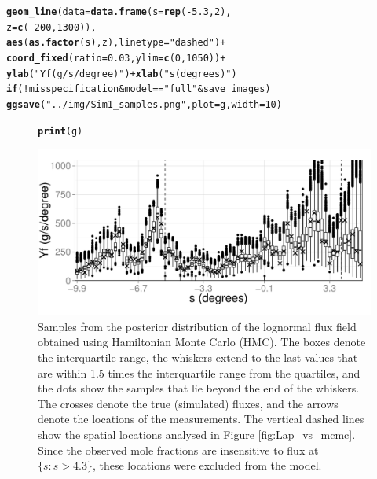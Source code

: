 \documentclass[a4paper,11pt]{article}\usepackage[]{graphicx}\usepackage[]{color}
\makeatletter
\def\maxwidth{ %
  \ifdim\Gin@nat@width>\linewidth
    \linewidth
  \else
    \Gin@nat@width
  \fi
}
\newcommand{\hlnum}[1]{\textcolor[rgb]{0.686,0.059,0.569}{#1}}%
\newcommand{\hlstr}[1]{\textcolor[rgb]{0.192,0.494,0.8}{#1}}%
\newcommand{\hlopt}[1]{\textcolor[rgb]{0,0,0}{#1}}%
\newcommand{\hlstd}[1]{\textcolor[rgb]{0.345,0.345,0.345}{#1}}%
\newcommand{\hlkwa}[1]{\textcolor[rgb]{0.161,0.373,0.58}{\textbf{#1}}}%
\newcommand{\hlkwc}[1]{\textcolor[rgb]{0.333,0.667,0.333}{#1}}%
\newcommand{\hlkwd}[1]{\textcolor[rgb]{0.737,0.353,0.396}{\textbf{#1}}}%
\newenvironment{kframe}{%
 \def\at@end@of@kframe{}%
 \ifinner\ifhmode%
  \def\at@end@of@kframe{\end{minipage}}%
  \begin{minipage}{\columnwidth}%
 \fi\fi%
 \def\FrameCommand##1{\hskip\@totalleftmargin \hskip-\fboxsep
 \colorbox{shadecolor}{##1}\hskip-\fboxsep
     \hskip-\linewidth \hskip-\@totalleftmargin \hskip\columnwidth}%
 \MakeFramed {\advance\hsize-\width
   \@totalleftmargin\z@ \linewidth\hsize
   \@setminipage}}%
 {\par\unskip\endMakeFramed%
 \at@end@of@kframe}
\newenvironment{knitrout}{}{} %
\makeatother
\begin{document}
\begin{knitrout}
\begin{kframe}
\begin{alltt}
  \hlkwd{geom_line}\hlstd{(}\hlkwc{data}\hlstd{=}\hlkwd{data.frame}\hlstd{(}\hlkwc{s}\hlstd{=}\hlkwd{rep}\hlstd{(}\hlopt{-}\hlnum{5.3}\hlstd{,}\hlnum{2}\hlstd{),}
                            \hlkwc{z}\hlstd{=}\hlkwd{c}\hlstd{(}\hlopt{-}\hlnum{200}\hlstd{,}\hlnum{1300}\hlstd{)),}
            \hlkwd{aes}\hlstd{(}\hlkwd{as.factor}\hlstd{(s),z),}\hlkwc{linetype}\hlstd{=}\hlstr{"dashed"}\hlstd{)} \hlopt{+}
  \hlkwd{coord_fixed}\hlstd{(}\hlkwc{ratio} \hlstd{=} \hlnum{0.03}\hlstd{,} \hlkwc{ylim}\hlstd{=}\hlkwd{c}\hlstd{(}\hlnum{0}\hlstd{,}\hlnum{1050}\hlstd{))} \hlopt{+}
  \hlkwd{ylab}\hlstd{(}\hlstr{"Yf (g/s/degree)"}\hlstd{)} \hlopt{+} \hlkwd{xlab}\hlstd{(}\hlstr{"s (degrees)"}\hlstd{)}
\hlkwa{if}\hlstd{(}\hlopt{!}\hlstd{misspecification} \hlopt{&} \hlstd{model}\hlopt{==}\hlstr{"full"} \hlopt{&} \hlstd{save_images)}
  \hlkwd{ggsave}\hlstd{(}\hlstr{"../img/Sim1_samples.png"}\hlstd{,}\hlkwc{plot} \hlstd{= g,}\hlkwc{width}\hlstd{=}\hlnum{10}\hlstd{)}
\end{alltt}
\end{kframe}
\end{knitrout}


\begin{figure}
\begin{center}
\begin{knitrout}
\color{fgcolor}\begin{kframe}
\begin{alltt}
\hlkwd{print}\hlstd{(g)}
\end{alltt}
\end{kframe}
\includegraphics[width=\maxwidth]{figure/HMC-plot-1} 

\end{knitrout}
\end{center}
\caption{Samples from the posterior distribution of the lognormal flux field obtained using Hamiltonian Monte Carlo (HMC). The boxes denote the interquartile range, the whiskers extend to the last values that are within 1.5 times the interquartile range from the quartiles, and the dots show the samples that lie beyond the end of the whiskers. The crosses denote the true (simulated) fluxes, and the arrows denote the locations of the measurements. The vertical dashed lines show the spatial locations analysed in Figure \ref{fig:Lap_vs_mcmc}. Since the observed mole fractions are insensitive to flux at $\{s : s > 4.3\}$, these locations were excluded from the model.}
\label{fig:Slice}
\end{figure}
\end{document}
